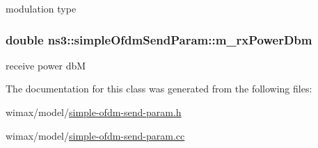 modulation type 

\subsubsection[{\texorpdfstring{m\+\_\+rx\+Power\+Dbm}{m_rxPowerDbm}}]{\setlength{\rightskip}{0pt plus 5cm}double ns3\+::simple\+Ofdm\+Send\+Param\+::m\+\_\+rx\+Power\+Dbm\hspace{0.3cm}{\ttfamily [private]}}\hypertarget{classns3_1_1simpleOfdmSendParam_aa1ee62a067667955c3392116dcb4a2c2}{}\label{classns3_1_1simpleOfdmSendParam_aa1ee62a067667955c3392116dcb4a2c2}


receive power dbM 



The documentation for this class was generated from the following files\+:\begin{DoxyCompactItemize}
\item 
wimax/model/\hyperlink{simple-ofdm-send-param_8h}{simple-\/ofdm-\/send-\/param.\+h}\item 
wimax/model/\hyperlink{simple-ofdm-send-param_8cc}{simple-\/ofdm-\/send-\/param.\+cc}\end{DoxyCompactItemize}

